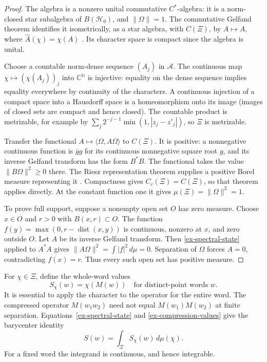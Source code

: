 \begin{proof}
The algebra is a nonzero unital commutative \(C^*\)-algebra: it is a
norm-closed star subalgebra of \(B(\mathcal H_0)\), and
\(\|\Omega\|=1\). The commutative Gelfand theorem identifies it
isometrically, as a star algebra, with \(C(\Xi)\), by
\(A\mapsto\widehat A\), where \(\widehat A(\chi)=\chi(A)\)
\cite[Theorem 2.13]{Williams}. Its character space is compact since the
algebra is unital.

Choose a countable norm-dense sequence \((A_j)\) in \(\mathcal A\).
The continuous map \(\chi\mapsto(\chi(A_j))_j\) into
\(\mathbb C^{\mathbb N}\) is injective: equality on the dense sequence
implies equality everywhere by continuity of the characters. A continuous
injection of a compact space into a Hausdorff space is a homeomorphism onto
its image (images of closed sets are compact and hence closed).
The countable product is metrizable, for example by
\(\sum_j2^{-j-1}\min(1,|z_j-z'_j|)\), so \(\Xi\) is metrizable.

Transfer the functional \(A\mapsto\langle\Omega,A\Omega\rangle\)
to \(C(\Xi)\). It is positive: a nonnegative continuous function is
\(\overline g g\) for its continuous nonnegative square root \(g\),
and its inverse Gelfand transform has the form \(B^*B\). The functional
takes the value \(\|B\Omega\|^2\ge0\) there. The Riesz representation
theorem supplies a positive Borel measure representing it
\cite[Chapter 6, Theorem 32]{Sawyer}. Compactness gives
\(C_c(\Xi)=C(\Xi)\), so that theorem applies directly. At the constant
function one it gives \(\mu(\Xi)=\|\Omega\|^2=1\).

To prove full support, suppose a nonempty open set \(O\) has zero measure.
Choose \(x\in O\) and \(r>0\) with \(B(x,r)\subset O\). The function
\(f(y)=\max(0,r-\operatorname{dist}(x,y))\) is continuous, nonzero at
\(x\), and zero outside \(O\). Let \(A\) be its inverse Gelfand
transform. Then \eqref{ex-spectral-state} applied to \(A^*A\) gives
\(\|A\Omega\|^2=\int|f|^2\,d\mu=0\). Separation of \(\Omega\)
forces \(A=0\), contradicting \(f(x)=r\). Thus every such open set has
positive measure.
\end{proof}

For \(\chi\in\Xi\), define the whole-word values
\begin{equation}\label{ex-phase-word}
 S_\chi(w)=\chi(M(w))
 \quad\text{for distinct-point words }w.
\end{equation}
It is essential to apply the character to the operator for the entire
word. The compressed operator \(M(w_1w_2)\) need not equal
\(M(w_1)M(w_2)\) at finite separation.
Equations~\eqref{ex-spectral-state} and \eqref{ex-compression-values} give
the barycenter identity
\begin{equation}\label{ex-phase-barycenter}
 S(w)=\int_\Xi S_\chi(w)\,d\mu(\chi).
\end{equation}
For a fixed word the integrand is continuous, and hence integrable.

